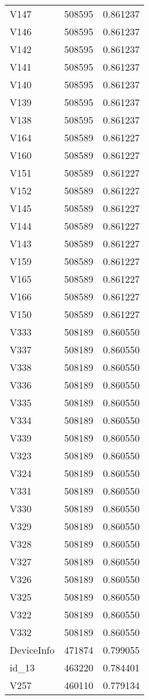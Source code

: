 \begin{tabular}{lrr}
V147 & 508595 & 0.861237 \\
V146 & 508595 & 0.861237 \\
V142 & 508595 & 0.861237 \\
V141 & 508595 & 0.861237 \\
V140 & 508595 & 0.861237 \\
V139 & 508595 & 0.861237 \\
V138 & 508595 & 0.861237 \\
V164 & 508589 & 0.861227 \\
V160 & 508589 & 0.861227 \\
V151 & 508589 & 0.861227 \\
V152 & 508589 & 0.861227 \\
V145 & 508589 & 0.861227 \\
V144 & 508589 & 0.861227 \\
V143 & 508589 & 0.861227 \\
V159 & 508589 & 0.861227 \\
V165 & 508589 & 0.861227 \\
V166 & 508589 & 0.861227 \\
V150 & 508589 & 0.861227 \\
V333 & 508189 & 0.860550 \\
V337 & 508189 & 0.860550 \\
V338 & 508189 & 0.860550 \\
V336 & 508189 & 0.860550 \\
V335 & 508189 & 0.860550 \\
V334 & 508189 & 0.860550 \\
V339 & 508189 & 0.860550 \\
V323 & 508189 & 0.860550 \\
V324 & 508189 & 0.860550 \\
V331 & 508189 & 0.860550 \\
V330 & 508189 & 0.860550 \\
V329 & 508189 & 0.860550 \\
V328 & 508189 & 0.860550 \\
V327 & 508189 & 0.860550 \\
V326 & 508189 & 0.860550 \\
V325 & 508189 & 0.860550 \\
V322 & 508189 & 0.860550 \\
V332 & 508189 & 0.860550 \\
DeviceInfo & 471874 & 0.799055 \\
id_13 & 463220 & 0.784401 \\
V257 & 460110 & 0.779134 \\

\end{tabular}
